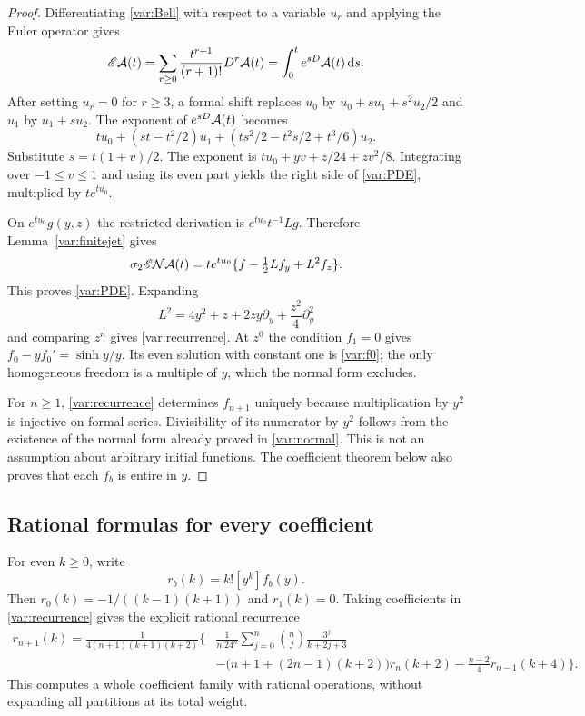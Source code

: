 \begin{proof}
Differentiating \eqref{var:Bell} with respect to a variable $u_r$
and applying the Euler operator gives
\begin{equation}\label{var:EA}
 \mathscr E\mathcal A(t)
 =\sum_{r\ge0}\frac{t^{r+1}}{(r+1)!}D^r\mathcal A(t)
 =\int_0^t e^{sD}\mathcal A(t)\,\mathrm d s.
\end{equation}
After setting $u_r=0$ for $r\ge3$, a formal shift replaces $u_0$
by $u_0+s u_1+s^2u_2/2$ and $u_1$ by $u_1+s u_2$.
The exponent of $e^{sD}\mathcal A(t)$ becomes
\[
 tu_0+(st-t^2/2)u_1+
       (ts^2/2-t^2s/2+t^3/6)u_2.
\]
Substitute $s=t(1+v)/2$. The exponent is
$tu_0+yv+z/24+zv^2/8$. Integrating over $-1\le v\le1$
and using its even part yields the right side of
\eqref{var:PDE}, multiplied by $te^{tu_0}$.

On $e^{tu_0}g(y,z)$ the restricted derivation is
$e^{tu_0}t^{-1}Lg$. Therefore Lemma~\ref{var:finitejet} gives
\[
 \sigma_2\mathscr E\mathcal N\mathcal A(t)
 =te^{tu_0}\{f-\tfrac12Lf_y+L^2f_z\}.
\]
This proves \eqref{var:PDE}. Expanding
\[
 L^2=4y^2+z+2zy\partial_y+\frac{z^2}{4}\partial_y^2
\]
and comparing $z^n$ gives \eqref{var:recurrence}. At $z^0$ the
condition $f_1=0$ gives
$f_0-yf_0'=\sinh y/y$. Its even solution with constant one is
\eqref{var:f0}; the only homogeneous freedom is a multiple of $y$,
which the normal form excludes.

For $n\ge1$, \eqref{var:recurrence} determines $f_{n+1}$ uniquely
because multiplication by $y^2$ is injective on formal series.
Divisibility of its numerator by $y^2$ follows from the existence of
the normal form already proved in \eqref{var:normal}. This is not an
assumption about arbitrary initial functions. The coefficient theorem
below also proves that each $f_b$ is entire in $y$.
\end{proof}

\subsection{Rational formulas for every coefficient}

For even $k\ge0$, write
\[
 r_b(k)=k![y^k]f_b(y).
\]
Then $r_0(k)=-1/((k-1)(k+1))$ and $r_1(k)=0$.
Taking coefficients in \eqref{var:recurrence} gives the explicit
rational recurrence
\begin{equation}\label{var:rrecurrence}
\begin{split}
 r_{n+1}(k)=\frac1{4(n+1)(k+1)(k+2)}\bigg\{
 &\frac1{n!24^n}\sum_{j=0}^n
              \binom nj\frac{3^j}{k+2j+3}\\
 &-\bigl(n+1+(2n-1)(k+2)\bigr)r_n(k+2)
 -\frac{n-2}{4}r_{n-1}(k+4)\bigg\}.
\end{split}
\end{equation}
This computes a whole coefficient family with rational operations,
without expanding all partitions at its total weight.

